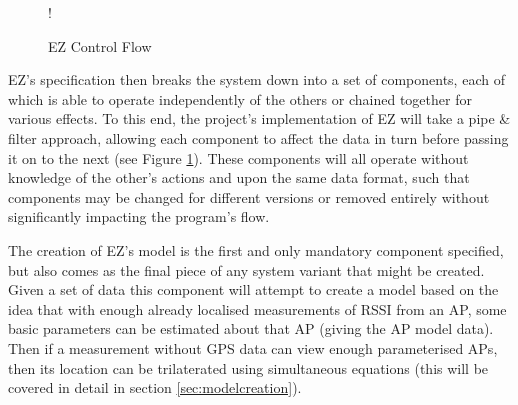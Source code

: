 \documentclass{UoYCSproject}
\begin{document}
            \begin{figure}[h]
            \label{fig:EZControl}
            \centering
            \resizebox {\textwidth} {!} {
	        }
            \caption{EZ Control Flow}
	        \end{figure}
            
            EZ's specification then breaks the system down into a set of components, each of which is able to operate independently of the others or chained together for various effects. To this end, the project's implementation of EZ will take a pipe \& filter approach, allowing each component to affect the data in turn before passing it on to the next (see Figure \ref{fig:EZControl}). These components will all operate without knowledge of the other's actions and upon the same data format, such that components may be changed for different versions or removed entirely without significantly impacting the program's flow.
            
            The creation of EZ's model is the first and only mandatory component specified, but also comes as the final piece of any system variant that might be created. Given a set of data this component will attempt to create a model based on the idea that with enough already localised measurements of RSSI from an AP, some basic parameters can be estimated about that AP (giving the AP model data). Then if a measurement without GPS data can view enough parameterised APs, then its location can be trilaterated using simultaneous equations (this will be covered in detail in section \ref{sec:modelcreation}).
            
\end{document}
